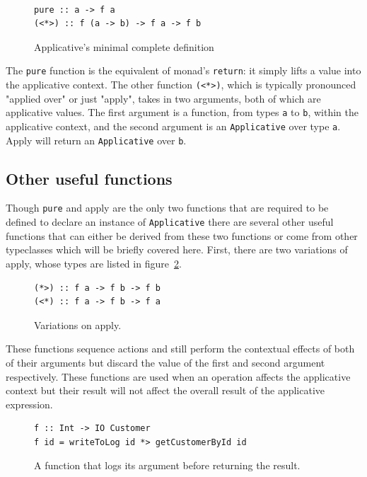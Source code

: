 \begin{figure}[t]
\begin{lstlisting}

pure :: a -> f a
(<*>) :: f (a -> b) -> f a -> f b
\end{lstlisting}
\caption{Applicative's minimal complete definition}
\label{appTypes}
\end{figure}

The \texttt{pure} function is the equivalent of monad's \texttt{return}: it simply lifts a value into the applicative context. The other function \texttt{(<*>)}, which is typically pronounced "applied over" or just "apply", takes in two arguments, both of which are applicative values. The first argument is a function, from types \texttt{a} to \texttt{b}, within the applicative context, and the second argument is an \texttt{Applicative} over type \texttt{a}. Apply will return an \texttt{Applicative} over \texttt{b}.

\subsection{Other useful functions}
\label{sec:useful}
Though \texttt{pure} and apply are the only two functions that are required to be defined to declare an instance of \texttt{Applicative} there are several other useful functions that can either be derived from these two functions or come from other typeclasses which will be briefly covered here. First, there are two variations of apply, whose types are listed in figure~\ref{appVars}.

\begin{figure}[t]
\begin{lstlisting}
(*>) :: f a -> f b -> f b
(<*) :: f a -> f b -> f a
\end{lstlisting}
\caption{Variations on apply.}
\label{appVars}
\end{figure}

These functions sequence actions and still perform the contextual effects of both of their arguments but discard the value of the first and second argument respectively. These functions are used when an operation affects the applicative context but their result will not affect the overall result of the applicative expression. 

\begin{figure}[t]
\begin{lstlisting}
f :: Int -> IO Customer
f id = writeToLog id *> getCustomerById id
\end{lstlisting}
\caption{A function that logs its argument before returning the result.}
\label{logApp}
\end{figure}

